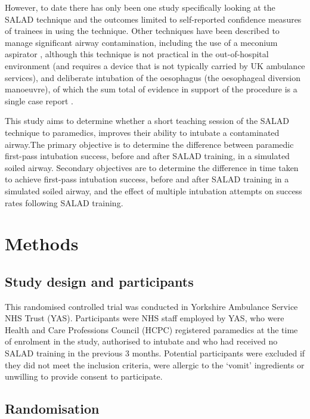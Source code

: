 \documentclass[]{article}
\begin{document}
However, to date there has only been one study specifically looking at
the SALAD technique and the outcomes limited to self-reported confidence
measures of trainees in using the technique. Other techniques have been
described to manage significant airway contamination, including the use
of a meconium aspirator \citep{kei_comparing_2017}, although this
technique is not practical in the out-of-hospital environment (and
requires a device that is not typically carried by UK ambulance
services), and deliberate intubation of the oesophagus (the oesophageal
diversion manoeuvre), of which the sum total of evidence in support of
the procedure is a single case report \citep{kornhall_intentional_2015}.

This study aims to determine whether a short teaching session of the
SALAD technique to paramedics, improves their ability to intubate a
contaminated airway.The primary objective is to determine the difference
between paramedic first-pass intubation success, before and after SALAD
training, in a simulated soiled airway. Secondary objectives are to
determine the difference in time taken to achieve first-pass intubation
success, before and after SALAD training in a simulated soiled airway,
and the effect of multiple intubation attempts on success rates
following SALAD training.

\hypertarget{methods-1}{%
\section{Methods}\label{methods-1}}

\hypertarget{study-design-and-participants}{%
\subsection{Study design and
participants}\label{study-design-and-participants}}

This randomised controlled trial was conducted in Yorkshire Ambulance
Service NHS Trust (YAS). Participants were NHS staff employed by YAS,
who were Health and Care Professions Council (HCPC) registered
paramedics at the time of enrolment in the study, authorised to intubate
and who had received no SALAD training in the previous 3 months.
Potential participants were excluded if they did not meet the inclusion
criteria, were allergic to the `vomit' ingredients or unwilling to
provide consent to participate.

\hypertarget{randomisation}{%
\subsection{Randomisation}\label{randomisation}}
\end{document}
